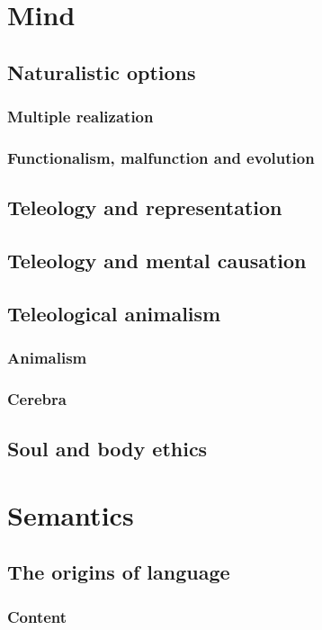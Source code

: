 \def\mychapter{VI}

\chapter{Mind}\label{ch:mind}
\section{Naturalistic options}
\subsection{Multiple realization}
\subsection{Functionalism, malfunction and evolution}
\section{Teleology and representation}
\section{Teleology and mental causation}
\section{Teleological animalism}
\subsection{Animalism}
\subsection{Cerebra}
\section{Soul and body ethics}
\chaptertail 

\def\mychapter{VII}

\chapter{Semantics}\label{ch:semantics}
\section{The origins of language}
\subsection{Content}
